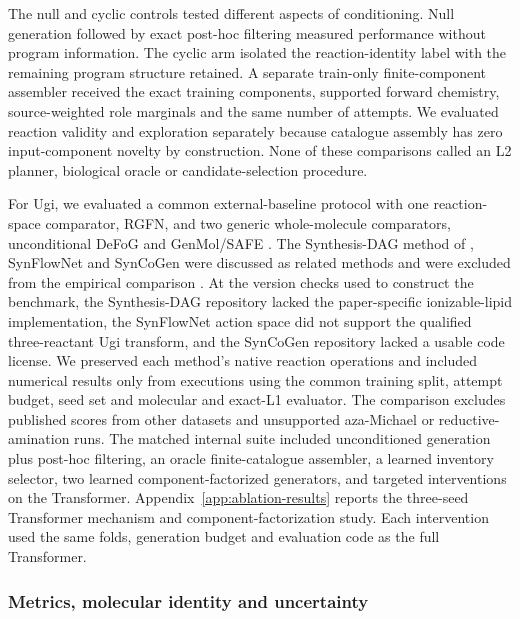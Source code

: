 \documentclass{article}
\theoremstyle{definition}
\begin{document}
The null and cyclic controls tested different aspects of conditioning. Null generation followed
by exact post-hoc filtering measured performance without program information. The cyclic arm
isolated the reaction-identity label with the remaining program structure retained. A separate
train-only finite-component assembler received the exact training components, supported forward
chemistry, source-weighted role marginals and the same number of attempts. We evaluated reaction
validity and exploration separately because catalogue assembly has zero input-component novelty
by construction. None of these comparisons called an L2 planner, biological oracle or
candidate-selection procedure.

For Ugi, we evaluated a common external-baseline protocol with one
reaction-space comparator, RGFN, and two generic whole-molecule comparators, unconditional DeFoG
and GenMol/SAFE \citep{koziarski2024rgfn,qin2025defog,lee2025genmol}.
The Synthesis-DAG method of \citet{ou2024deep}, SynFlowNet and SynCoGen were discussed as related methods and were
excluded from the empirical comparison \citep{cretu2025synflownet,rekesh2025syncogen}.
At the version checks used to construct the benchmark, the Synthesis-DAG repository lacked the
paper-specific ionizable-lipid implementation, the SynFlowNet action space did not support the
qualified three-reactant Ugi transform, and the SynCoGen repository lacked a usable code license.
We preserved each method's native reaction operations and included numerical results only from
executions using the common training split, attempt budget, seed set and molecular and exact-L1
evaluator. The comparison excludes published scores from other datasets and unsupported
aza-Michael or reductive-amination runs.
The matched internal suite included unconditioned generation plus post-hoc filtering, an
oracle finite-catalogue assembler, a learned inventory selector, two learned component-factorized
generators, and targeted interventions on the Transformer. Appendix~\ref{app:ablation-results}
reports the three-seed Transformer mechanism and component-factorization study. Each
intervention used the same folds, generation budget and evaluation code as the full Transformer.

\subsubsection{Metrics, molecular identity and uncertainty}
\end{document}
